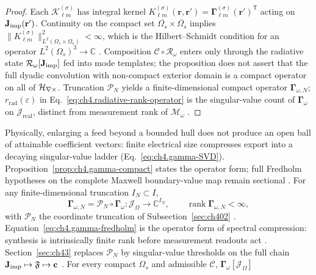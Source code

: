 \begin{proof}
Each $\mathcal{K}_{\ell m}^{(\sigma)}$ has integral kernel
$K_{\ell m}^{(\sigma)}(\mathbf{r},\mathbf{r}')=\boldsymbol{\Gamma}_{\ell m}^{(\sigma)}(\mathbf{r}')^{\mathsf{T}}$
acting on $\mathbf{J}_{\mathrm{imp}}(\mathbf{r}')$.
Continuity on the compact set $\overline{\Omega_{s}}\times\overline{\Omega_{s}}$ implies
$\|K_{\ell m}^{(\sigma)}\|_{L^{2}(\Omega_{s}\times\Omega_{s})}^{2}<\infty$, which is the Hilbert--Schmidt condition
for an operator $L^{2}(\Omega_{s})^{3}\to\mathbb{C}$ \cite{kato1995}.
Composition $\mathcal{C}\circ\mathcal{R}_\omega$ enters only through the radiative state
$\mathcal{R}_\omega[\mathbf{J}_{\mathrm{imp}}]$ fed into mode templates; the proposition does not assert that the full
dyadic convolution with non-compact exterior domain is a compact operator on all of $\mathcal{H}_{\nabla\times}$.
Truncation $\mathcal{P}_{N}$ yields a finite-dimensional compact operator
$\boldsymbol{\Gamma}_{\omega,N}$; $r_{\mathrm{rad}}(\varepsilon)$ in Eq.~\eqref{eq:ch4.radiative-rank-operator}
is the singular-value count of $\boldsymbol{\Gamma}_\omega$ on $\mathcal{J}_{\mathrm{real}}$, distinct from
measurement rank of $\boldsymbol{\mathcal{M}}_\omega$ \cite{harrington2001}.
\end{proof}
Physically, enlarging a feed beyond a bounded hull does not produce an open ball of attainable coefficient vectors:
finite electrical size compresses export into a decaying singular-value ladder
(Eq.~\eqref{eq:ch4.gamma-SVD}). Proposition~\ref{prop:ch4.gamma-compact} states the operator form; full
Fredholm hypotheses on the complete Maxwell boundary-value map remain sectional \cite{harrington2001}.
For any finite-dimensional truncation \(I_{N}\subset I\),
\begin{equation}
\label{eq:ch4.gamma-fredholm}
\boldsymbol{\Gamma}_{\omega,N}
=
\mathcal{P}_{N}\circ\boldsymbol{\Gamma}_\omega:
\mathcal{J}_\Omega\to\mathbb{C}^{I_{N}},
\qquad
\operatorname{rank}\boldsymbol{\Gamma}_{\omega,N}<\infty,
\end{equation}
with \(\mathcal{P}_{N}\) the coordinate truncation of Subsection~\ref{sec:ch402}
\cite{hansen1988}. Equation~\eqref{eq:ch4.gamma-fredholm} is the operator form of
spectral compression: synthesis is intrinsically finite rank before measurement readouts act
\cite{stratton1941}. Section~\ref{sec:ch43} replaces \(\mathcal{P}_{N}\) by singular-value thresholds on the
full chain \(\mathbf{J}_{\mathrm{imp}}\mapsto\mathfrak{F}\mapsto\mathbf{c}\) \cite{devaney2004}.
\label{cor:ch4.synthesis-not-open}
For every compact \(\Omega_{s}\) and admissible \(\mathcal{C}\), \(\boldsymbol{\Gamma}_\omega[\mathcal{J}_\Omega]\)
